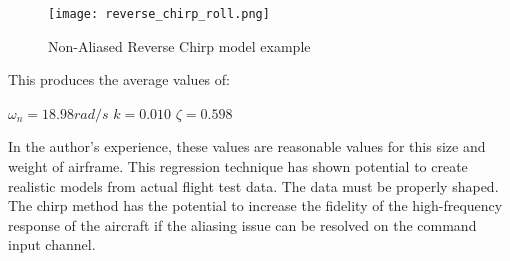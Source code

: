 \begin{figure}[!h]
 \centering
  \texttt{[image: reverse\_chirp\_roll.png]}
  \caption{Non-Aliased Reverse Chirp model example}
  \label{fig:reverse_chirp_model}
\end{figure}

This produces the average values of:

$\omega_n=18.98 rad/s$ \newline
$k = 0.010$ \newline
$\zeta=0.598$ \newline

In the author's experience, these values are reasonable values for this size and weight of airframe.  This regression technique has shown potential to create realistic models from actual flight test data.  The data must be properly shaped.  The chirp method has the potential to increase the fidelity of the high-frequency response of the aircraft if the aliasing issue can be resolved on the command input channel.
